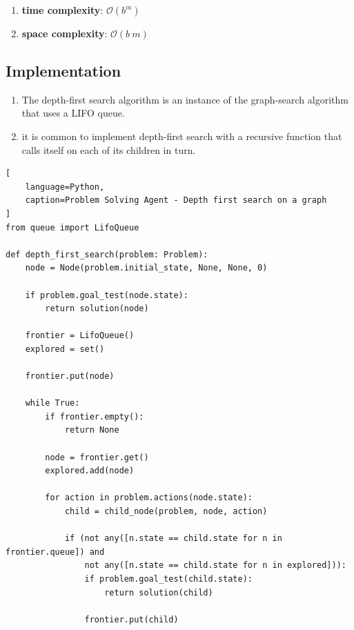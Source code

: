 \begin{enumerate}[itemsep=0.2cm]
\begin{enumerate}[itemsep=0.2cm]
\begin{enumerate}[itemsep=0.2cm]
            \item \textbf{time complexity}: $\mathcal{O}(b^m)$
            \hfill \cite{ai/book/Artificial-Intelligence-A-Modern-Approach/Russell-Norvig}

            \item \textbf{space complexity}: $\mathcal{O}(b\ m)$
            \hfill \cite{ai/book/Artificial-Intelligence-A-Modern-Approach/Russell-Norvig}
        \end{enumerate}
    \end{enumerate}
\end{enumerate}


\subsection{Implementation}

\begin{enumerate}[itemsep=0.2cm]
    \item The depth-first search algorithm is an instance of the graph-search algorithm that uses a LIFO queue.
    \hfill \cite{ai/book/Artificial-Intelligence-A-Modern-Approach/Russell-Norvig}

    \item  it is common to implement depth-first search with a recursive function that calls itself  on each of its children in turn. 
    \hfill \cite{ai/book/Artificial-Intelligence-A-Modern-Approach/Russell-Norvig}
\end{enumerate}

\begin{lstlisting}[
    language=Python,
    caption=Problem Solving Agent - Depth first search on a graph
]
from queue import LifoQueue

def depth_first_search(problem: Problem):
    node = Node(problem.initial_state, None, None, 0)

    if problem.goal_test(node.state):
        return solution(node)
    
    frontier = LifoQueue()
    explored = set()

    frontier.put(node)

    while True:
        if frontier.empty():
            return None
        
        node = frontier.get()
        explored.add(node)

        for action in problem.actions(node.state):
            child = child_node(problem, node, action)

            if (not any([n.state == child.state for n in frontier.queue]) and 
                not any([n.state == child.state for n in explored])):
                if problem.goal_test(child.state):
                    return solution(child)

                frontier.put(child)
\end{lstlisting}














